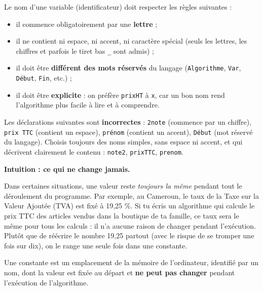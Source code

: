 \documentclass[11pt]{article}
\newcommand{\cle}[1]{{\popxbold\color{popdark}#1}}
\newcounter{popsec}
\newcounter{popsub}
\newcommand{\courssub}[1]{%
  \stepcounter{popsub}%
  \par\vspace{9pt}\noindent{\popxbold\fontsize{11.5}{13}\selectfont\color{popink}{\color{poporange}\thepopsec.\thepopsub}\hspace{6pt}#1}\par\nopagebreak\vspace{4pt}
}
\begin{document}
\begin{propriete}
Le nom d'une variable (identificateur) doit respecter les règles suivantes :
\begin{itemize}
\item il commence obligatoirement par une \textbf{lettre} ;
\item il ne contient ni espace, ni accent, ni caractère spécial (seuls les lettres, les chiffres et parfois le tiret bas \texttt{\_} sont admis) ;
\item il doit être \textbf{différent des mots réservés} du langage (\texttt{Algorithme}, \texttt{Var}, \texttt{Début}, \texttt{Fin}, etc.) ;
\item il doit être \textbf{explicite} : on préfère \texttt{prixHT} à \texttt{x}, car un bon nom rend l'algorithme plus facile à lire et à comprendre.
\end{itemize}
\end{propriete}

\begin{attention}
Les déclarations suivantes sont \textbf{incorrectes} : \texttt{2note} (commence par un chiffre), \texttt{prix TTC} (contient un espace), \texttt{prénom} (contient un accent), \texttt{Début} (mot réservé du langage). Choisis toujours des noms simples, sans espace ni accent, et qui décrivent clairement le contenu : \texttt{note2}, \texttt{prixTTC}, \texttt{prenom}.
\end{attention}

\courssub{La notion de constante}

\textbf{Intuition : ce qui ne change jamais.}

Dans certaines situations, une valeur reste \emph{toujours la même} pendant tout le déroulement du programme. Par exemple, au Cameroun, le taux de la Taxe sur la Valeur Ajoutée (TVA) est fixé à 19,25 \%. Si tu écris un algorithme qui calcule le prix TTC des articles vendus dans la boutique de ta famille, ce taux sera le même pour tous les calculs : il n'a aucune raison de changer pendant l'exécution. Plutôt que de réécrire le nombre 19,25 partout (avec le risque de se tromper une fois sur dix), on le range une seule fois dans une \cle{constante}.

\begin{definition}[Constante]
Une \cle{constante} est un emplacement de la mémoire de l'ordinateur, identifié par un nom, dont la valeur est fixée au départ et \textbf{ne peut pas changer} pendant l'exécution de l'algorithme.
\end{definition}
\end{document}
